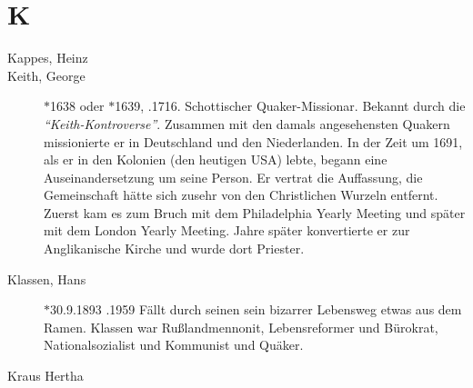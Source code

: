 \section*{K}

\articlesize

\begin{description}

\item[Kappes, Heinz]

 \item[Keith, George] $\ast$1638 oder $\ast$1639, .1716. Schottischer Quaker-Missionar. Bekannt durch die \textit{"`Keith-Kontroverse"'}. Zusammen mit den damals angesehensten Quakern missionierte er in Deutschland und den Niederlanden. In der Zeit um 1691, als er in den Kolonien (den heutigen USA) lebte, begann eine Auseinandersetzung um seine Person. Er vertrat die Auffassung, die Gemeinschaft hätte sich zusehr von den Christlichen Wurzeln entfernt. Zuerst kam es zum Bruch mit dem Philadelphia Yearly Meeting und später mit dem London Yearly Meeting. Jahre später konvertierte er zur Anglikanische Kirche und wurde dort Priester.


 \item[Klassen, Hans] $\ast$30.9.1893 .1959 Fällt durch seinen sein bizarrer Lebensweg etwas aus dem Ramen. Klassen war Rußlandmennonit, Lebensreformer und Bürokrat, Nationalsozialist und Kommunist und Quäker.

 \item[Kraus Hertha]



 \end{description}
\normalsize
